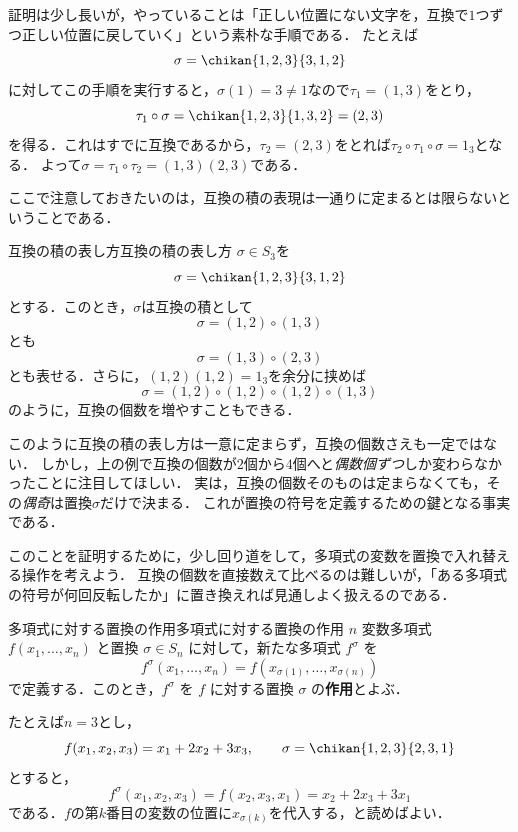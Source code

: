 証明は少し長いが，やっていることは「正しい位置にない文字を，互換で$1$つずつ正しい位置に戻していく」という素朴な手順である．
たとえば
\[
  \sigma = \chikan{1,2,3}{3,1,2}
\]
に対してこの手順を実行すると，$\sigma(1) = 3 \ne 1$なので$\tau_1 = (1, 3)$をとり，
\[
  \tau_1 \circ \sigma = \chikan{1,2,3}{1,3,2} = (2, 3)
\]
を得る．これはすでに互換であるから，$\tau_2 = (2, 3)$をとれば$\tau_2 \circ \tau_1 \circ \sigma = 1_3$となる．
よって$\sigma = \tau_1 \circ \tau_2 = (1, 3)(2, 3)$である．

ここで注意しておきたいのは，互換の積の表現は一通りに定まるとは限らないということである．

\begin{example}{互換の積の表し方}{互換の積の表し方}
  $\sigma \in S_3$を
  \[
  \sigma = \chikan{1, 2, 3}{3, 1, 2}
  \]
  とする．このとき，$\sigma$は互換の積として
  \[
  \sigma = (1, 2) \circ (1, 3)
  \]
  とも
  \[
  \sigma = (1, 3) \circ (2, 3)
  \]
  とも表せる．さらに，$(1,2)(1,2) = 1_3$を余分に挟めば
  \[
    \sigma = (1, 2) \circ (1, 2) \circ (1, 2) \circ (1, 3)
  \]
  のように，互換の個数を増やすこともできる．
\end{example}

このように互換の積の表し方は一意に定まらず，互換の個数さえも一定ではない．
しかし，上の例で互換の個数が$2$個から$4$個へと\emph{偶数個ずつ}しか変わらなかったことに注目してほしい．
実は，互換の個数そのものは定まらなくても，その\emph{偶奇}は置換$\sigma$だけで決まる．
これが置換の符号を定義するための鍵となる事実である．

このことを証明するために，少し回り道をして，多項式の変数を置換で入れ替える操作を考えよう．
互換の個数を直接数えて比べるのは難しいが，「ある多項式の符号が何回反転したか」に置き換えれば見通しよく扱えるのである．

\begin{definition}{多項式に対する置換の作用}{多項式に対する置換の作用}
  $n$ 変数多項式 $f(x_1, \dots, x_n)$ と置換 $\sigma \in S_n$ に対して，新たな多項式 $f^\sigma$ を
  \[
  f^\sigma(x_1, \dots, x_n) = f(x_{\sigma(1)}, \dots, x_{\sigma(n)})
  \]
  で定義する．このとき，$f^\sigma$ を $f$ に対する置換 $\sigma$ の\textbf{作用}とよぶ．
\end{definition}

たとえば$n = 3$とし，
\[
  f(x_1, x_2, x_3) = x_1 + 2x_2 + 3x_3, \qquad
  \sigma = \chikan{1,2,3}{2,3,1}
\]
とすると，
\[
  f^\sigma(x_1, x_2, x_3) = f(x_2, x_3, x_1) = x_2 + 2x_3 + 3x_1
\]
である．$f$の第$k$番目の変数の位置に$x_{\sigma(k)}$を代入する，と読めばよい．

